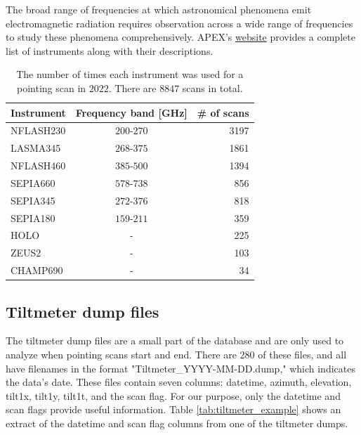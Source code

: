 The broad range of frequencies at which astronomical phenomena emit electromagnetic radiation requires observation across a wide range of frequencies to study these phenomena comprehensively.
APEX's \href{https://www.eso.org/sci/facilities/apex/cfp/cfp110/instrument_summary.html.html}{website} provides a complete list of instruments along with their descriptions.
\begin{table}[H]
    \centering
    \caption{The number of times each instrument was used for a pointing scan in $2022$. There are $8847$ scans in total.}
    \begin{tabular}{lcr}
        \toprule
        Instrument & Frequency band [GHz] &\# of scans \\
        \midrule
        NFLASH230 & $200$-$270$ &3197 \\
        LASMA345  & $268$-$375$ &1861 \\
        NFLASH460 & $385$-$500$ &1394 \\
        SEPIA660  & $578$-$738$ & 856 \\
        SEPIA345  & $272$-$376$ & 818 \\
        SEPIA180  & $159$-$211$ & 359 \\
        HOLO      & - & 225 \\
        ZEUS2     & - & 103 \\
        CHAMP690  & - &  34 \\
        \bottomrule
        \end{tabular}
        \label{tab:instrument_usage}
\end{table}



\subsection{Tiltmeter dump files}
The tiltmeter dump files are a small part of the database and are only used to analyze when pointing scans start and end.
There are 280 of these files, and all have filenames in the format "Tiltmeter\_YYYY-MM-DD.dump," which indicates the data's date.
These files contain seven columns: datetime, azimuth, elevation, tilt1x, tilt1y, tilt1t, and the scan flag.
For our purpose, only the datetime and scan flags provide useful information.
Table \ref{tab:tiltmeter_example} shows an extract of the datetime and scan flag columns from one of the tiltmeter dumps.


